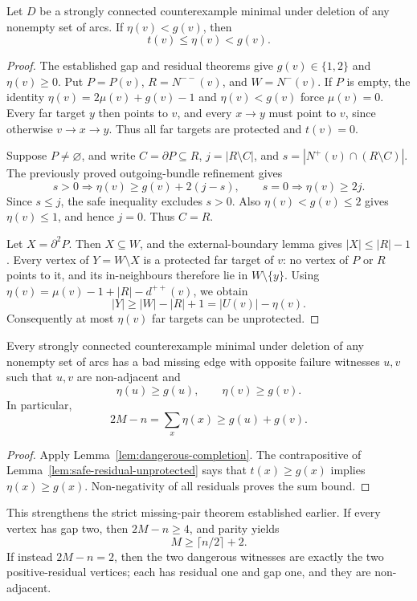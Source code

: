 \begin{lemma}
\label{lem:safe-residual-unprotected}
Let $D$ be a strongly connected counterexample minimal under deletion
of any nonempty set of arcs. If $\eta(v)<g(v)$, then
\[
 {t(v)\le\eta(v)<g(v).}
\]
\end{lemma}

\begin{proof}
The established gap and residual theorems give $g(v)\in\{1,2\}$ and
$\eta(v)\ge0$. Put $P=P(v)$, $R=N^{--}(v)$, and $W=N^-(v)$.
If $P$ is empty, the identity
$\eta(v)=2\mu(v)+g(v)-1$ and $\eta(v)<g(v)$ force $\mu(v)=0$.
Every far target $y$ then points to $v$, and every $x\to y$ must
point to $v$, since otherwise $v\to x\to y$. Thus all far targets
are protected and $t(v)=0$.

Suppose $P\ne\varnothing$, and write $C=\partial P\subseteq R$,
$j=|R\setminus C|$, and $s=|N^+(v)\cap(R\setminus C)|$.
The previously proved outgoing-bundle refinement gives
\[
 s>0\Longrightarrow\eta(v)\ge g(v)+2(j-s),
 \qquad
 s=0\Longrightarrow\eta(v)\ge2j.
\]
Since $s\le j$, the safe inequality excludes $s>0$. Also
$\eta(v)<g(v)\le2$ gives $\eta(v)\le1$, and hence $j=0$.
Thus $C=R$.

Let $X=\partial^2P$. Then $X\subseteq W$, and the external-boundary
lemma gives $|X|\le|R|-1$. Every vertex of $Y=W\setminus X$ is a
protected far target of $v$: no vertex of $P$ or $R$ points to it,
and its in-neighbours therefore lie in $W\setminus\{y\}$.
Using $\eta(v)=\mu(v)-1+|R|-d^{++}(v)$, we obtain
\[
 |Y|\ge|W|-|R|+1=|U(v)|-\eta(v).
\]
Consequently at most $\eta(v)$ far targets can be unprotected.
\end{proof}

\begin{proposition}
\label{prop:dangerous-residual-witnesses}
Every strongly connected counterexample minimal under deletion of any
nonempty set of arcs has a bad missing edge with opposite failure
witnesses $u,v$ such that $u,v$ are non-adjacent and
\[
 {\eta(u)\ge g(u),\qquad\eta(v)\ge g(v).}
\]
In particular,
\[
 2M-n=\sum_x\eta(x)\ge g(u)+g(v).
\]
\end{proposition}

\begin{proof}
Apply Lemma~\ref{lem:dangerous-completion}. The contrapositive of
Lemma~\ref{lem:safe-residual-unprotected} says that
$t(x)\ge g(x)$ implies $\eta(x)\ge g(x)$. Non-negativity of all
residuals proves the sum bound.
\end{proof}

This strengthens the strict missing-pair theorem established earlier.
If every vertex has gap two, then $2M-n\ge4$, and parity yields
\[
 {M\ge\lceil n/2\rceil+2.}
\]
If instead $2M-n=2$, then the two dangerous witnesses are exactly the
two positive-residual vertices; each has residual one and gap one,
and they are non-adjacent.
